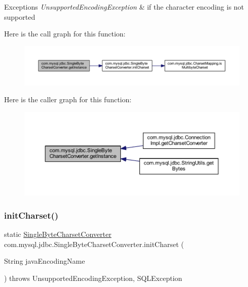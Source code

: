 \begin{DoxyExceptions}{Exceptions}
{\em Unsupported\+Encoding\+Exception} & if the character encoding is not supported \\
\hline
\end{DoxyExceptions}
Here is the call graph for this function\+:
\nopagebreak
\begin{figure}[H]
\begin{center}
\leavevmode
\includegraphics[width=350pt]{classcom_1_1mysql_1_1jdbc_1_1_single_byte_charset_converter_a38d3994fc1cbfec7c61d072303f124b5_cgraph}
\end{center}
\end{figure}
Here is the caller graph for this function\+:
\nopagebreak
\begin{figure}[H]
\begin{center}
\leavevmode
\includegraphics[width=350pt]{classcom_1_1mysql_1_1jdbc_1_1_single_byte_charset_converter_a38d3994fc1cbfec7c61d072303f124b5_icgraph}
\end{center}
\end{figure}
\mbox{\label{classcom_1_1mysql_1_1jdbc_1_1_single_byte_charset_converter_a756d8433aca86ef6942c0eb1a106a898}} 
\subsubsection{\texorpdfstring{init\+Charset()}{initCharset()}}
{\footnotesize\ttfamily static \mbox{\hyperlink{classcom_1_1mysql_1_1jdbc_1_1_single_byte_charset_converter}{Single\+Byte\+Charset\+Converter}} com.\+mysql.\+jdbc.\+Single\+Byte\+Charset\+Converter.\+init\+Charset (\begin{DoxyParamCaption}\item[{String}]{java\+Encoding\+Name }\end{DoxyParamCaption}) throws Unsupported\+Encoding\+Exception, S\+Q\+L\+Exception\hspace{0.3cm}{\ttfamily [static]}}

